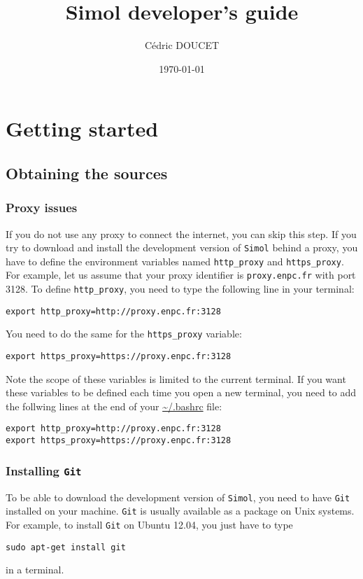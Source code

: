 \documentclass[12pt]{book}
\title{Simol developer's guide}
\author{C\'edric DOUCET}
\date{\today}
\newcommand{\Git}{\texttt{Git}\xspace}
\newcommand{\Simol}{\texttt{Simol}\xspace}
\begin{document}
\maketitle
\tableofcontents



\chapter{Getting started}

\section{Obtaining the sources}


\subsection{Proxy issues}

If you do not use any proxy to connect the internet, you can skip this step. If you try to download and install the development version of \Simol behind a proxy, you have to define the environment variables named \texttt{http\_proxy} and \texttt{https\_proxy}. For example, let us assume that your proxy identifier is \texttt{proxy.enpc.fr} with port 3128. To define \texttt{http\_proxy}, you need to type the following line in your terminal:
\lstset{language=bash} 
\begin{lstlisting}
export http_proxy=http://proxy.enpc.fr:3128
\end{lstlisting}
You need to do the same for the \texttt{https\_proxy} variable:
\lstset{language=bash} 
\begin{lstlisting}
export https_proxy=https://proxy.enpc.fr:3128
\end{lstlisting}
Note the scope of these variables is limited to the current terminal. If you want these variables to be defined each time you open a new terminal, you need to add the follwing lines at the end of your \url{~/.bashrc} file:
\lstset{language=bash} 
\begin{lstlisting}
export http_proxy=http://proxy.enpc.fr:3128
export https_proxy=https://proxy.enpc.fr:3128
\end{lstlisting}

\subsection{Installing \Git}

To be able to download the development version of \Simol, you need to have \Git installed on your machine. \Git is usually available as a package on Unix systems. For example, to install \Git on Ubuntu 12.04, you just have to type
\lstset{language=bash} 
\begin{lstlisting}
sudo apt-get install git
\end{lstlisting}
in a terminal. 
\end{document}
